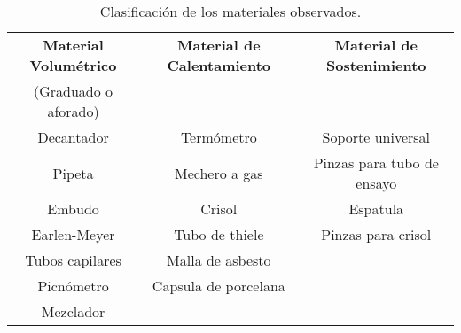 
\begin{table*}[p]
\centering
\begin{tabular}{|c|c|c|}
\hline
\bfseries Material Volumétrico & \bfseries Material de Calentamiento & \bfseries Material de Sostenimiento \\
(Graduado o aforado) & & \\
\hline
Decantador & Termómetro & Soporte universal \\
\hline
Pipeta & Mechero a gas & Pinzas para tubo de ensayo \\
\hline
Embudo & Crisol & Espatula \\
\hline
Earlen-Meyer & Tubo de thiele & Pinzas para crisol \\
\hline
Tubos capilares & Malla de asbesto & \\
\hline
Picnómetro & Capsula de porcelana & \\
\hline
Mezclador & & \\
\hline
\end{tabular}
\caption{Clasificación de los materiales observados.}
\label{tab:clas-materiales}
\end{table*}
